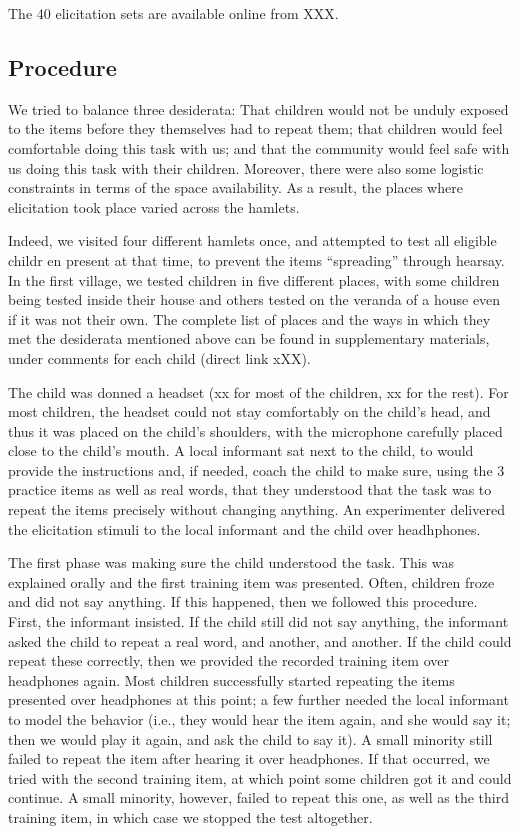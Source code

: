 \documentclass[english,,man,floatsintext]{apa6}
\begin{document}
The 40 elicitation sets are available online from XXX.

\hypertarget{procedure}{%
\subsection{Procedure}\label{procedure}}

We tried to balance three desiderata: That children would not be unduly exposed to the items before they themselves had to repeat them; that children would feel comfortable doing this task with us; and that the community would feel safe with us doing this task with their children. Moreover, there were also some logistic constraints in terms of the space availability. As a result, the places where elicitation took place varied across the hamlets.

Indeed, we visited four different hamlets once, and attempted to test all eligible childr en present at that time, to prevent the items \enquote{spreading} through hearsay. In the first village, we tested children in five different places, with some children being tested inside their house and others tested on the veranda of a house even if it was not their own. The complete list of places and the ways in which they met the desiderata mentioned above can be found in supplementary materials, under comments for each child (direct link xXX).

The child was donned a headset (xx for most of the children, xx for the rest). For most children, the headset could not stay comfortably on the child's head, and thus it was placed on the child's shoulders, with the microphone carefully placed close to the child's mouth. A local informant sat next to the child, to would provide the instructions and, if needed, coach the child to make sure, using the 3 practice items as well as real words, that they understood that the task was to repeat the items precisely without changing anything. An experimenter delivered the elicitation stimuli to the local informant and the child over headhphones.

The first phase was making sure the child understood the task. This was explained orally and the first training item was presented. Often, children froze and did not say anything. If this happened, then we followed this procedure. First, the informant insisted. If the child still did not say anything, the informant asked the child to repeat a real word, and another, and another. If the child could repeat these correctly, then we provided the recorded training item over headphones again. Most children successfully started repeating the items presented over headphones at this point; a few further needed the local informant to model the behavior (i.e., they would hear the item again, and she would say it; then we would play it again, and ask the child to say it). A small minority still failed to repeat the item after hearing it over headphones. If that occurred, we tried with the second training item, at which point some children got it and could continue. A small minority, however, failed to repeat this one, as well as the third training item, in which case we stopped the test altogether.
\end{document}
